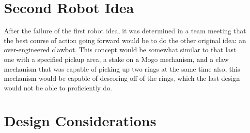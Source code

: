 \section*{Second Robot Idea}

After the failure of the first robot idea, it was determined in a team meeting that the best course of action going forward would be to do the other original idea: an over-engineered clawbot. This concept would be somewhat similar to that last one with a specified pickup area, a stake on a Mogo mechanism, and a claw mechanism that was capable of picking up two rings at the same time  also, this mechanism would be capable of descoring off of the rings, which the last design would not be able to proficiently do.

\section*{Design Considerations}

